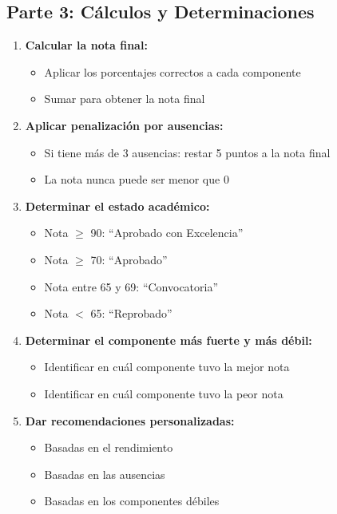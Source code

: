\documentclass[12pt,a4paper]{article}
\begin{document}
\subsection{Parte 3: Cálculos y Determinaciones}

\begin{enumerate}[leftmargin=*]
    \item \textbf{Calcular la nota final:}
    \begin{itemize}
        \item Aplicar los porcentajes correctos a cada componente
        \item Sumar para obtener la nota final
    \end{itemize}
    
    \item \textbf{Aplicar penalización por ausencias:}
    \begin{itemize}
        \item Si tiene más de 3 ausencias: restar 5 puntos a la nota final
        \item La nota nunca puede ser menor que 0
    \end{itemize}
    
    \item \textbf{Determinar el estado académico:}
    \begin{itemize}
        \item Nota $\geq$ 90: ``Aprobado con Excelencia''
        \item Nota $\geq$ 70: ``Aprobado''
        \item Nota entre 65 y 69: ``Convocatoria''
        \item Nota $<$ 65: ``Reprobado''
    \end{itemize}
    
    \item \textbf{Determinar el componente más fuerte y más débil:}
    \begin{itemize}
        \item Identificar en cuál componente tuvo la mejor nota
        \item Identificar en cuál componente tuvo la peor nota
    \end{itemize}
    
    \item \textbf{Dar recomendaciones personalizadas:}
    \begin{itemize}
        \item Basadas en el rendimiento
        \item Basadas en las ausencias
        \item Basadas en los componentes débiles
    \end{itemize}
\end{enumerate}
\end{document}
